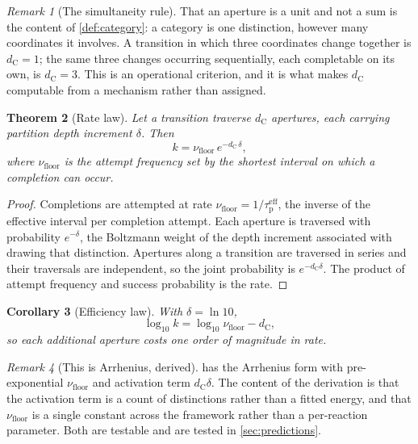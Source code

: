 \documentclass[11pt,twocolumn,a4paper]{article}
\theoremstyle{plain}
\newtheorem{theorem}{Theorem}[section]
\newtheorem{corollary}[theorem]{Corollary}
\theoremstyle{definition}
\theoremstyle{remark}
\newtheorem{remark}[theorem]{Remark}
\newcommand{\dC}{d_{\mathrm{C}}}
\newcommand{\taup}{\tau_{\mathrm{p}}}
\newcommand{\nufloor}{\nu_{\mathrm{floor}}}
\begin{document}
\begin{remark}[The simultaneity rule]
\label{rem:simultaneity}
That an aperture is a unit and not a sum is the content of \cref{def:category}:
a category is one distinction, however many coordinates it involves. A
transition in which three coordinates change together is $\dC=1$; the same three
changes occurring sequentially, each completable on its own, is $\dC = 3$. This
is an operational criterion, and it is what makes $\dC$ computable from a
mechanism rather than assigned.
\end{remark}

\begin{theorem}[Rate law]
\label{thm:rate}
Let a transition traverse $\dC$ apertures, each carrying partition depth
increment $\delta$. Then
\begin{equation}
k = \nufloor \, e^{-\dC\,\delta} ,
\label{eq:rate}
\end{equation}
where $\nufloor$ is the attempt frequency set by the shortest interval on which
a completion can occur.
\end{theorem}

\begin{proof}
Completions are attempted at rate $\nufloor = 1/\taup^{\mathrm{eff}}$, the
inverse of the effective interval per completion attempt. Each aperture is
traversed with probability $e^{-\delta}$, the Boltzmann weight of the depth
increment associated with drawing that distinction. Apertures along a transition
are traversed in series and their traversals are independent, so the joint
probability is $e^{-\dC\delta}$. The product of attempt frequency and success
probability is the rate.
\end{proof}

\begin{corollary}[Efficiency law]
\label{cor:efficiency}
With $\delta = \ln 10$,
\begin{equation}
\log_{10} k = \log_{10}\nufloor - \dC ,
\label{eq:efficiency}
\end{equation}
so each additional aperture costs one order of magnitude in rate.
\end{corollary}

\begin{remark}[This is Arrhenius, derived]
 has the Arrhenius form with pre-exponential $\nufloor$ and
activation term $\dC\delta$. The content of the derivation is that the
activation term is a count of distinctions rather than a fitted energy, and that
$\nufloor$ is a single constant across the framework rather than a per-reaction
parameter. Both are testable and are tested in \cref{sec:predictions}.
\end{remark}
\end{document}
